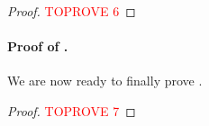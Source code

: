 \begin{proof}\textcolor{red}{TOPROVE 6}\end{proof}


%
\paragraph{Proof of .}
 We are now ready to finally prove .

\begin{proof}\textcolor{red}{TOPROVE 7}\end{proof}

